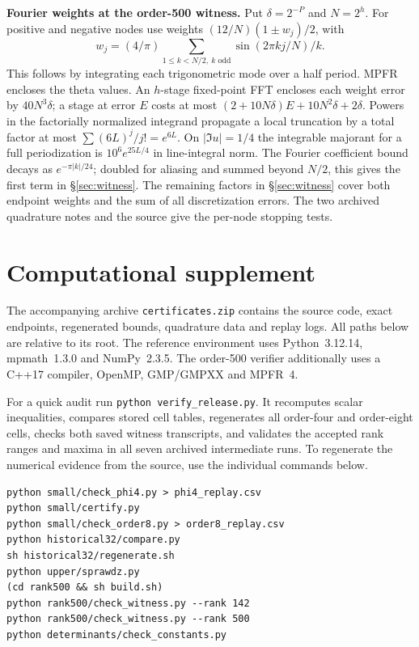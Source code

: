 \documentclass[11pt,a4paper,reqno]{amsart}
\numberwithin{equation}{section}
\begin{document}
\textbf{Fourier weights at the order-500 witness.} Put \(\delta=2^{-P}\) and \(N=2^h\). For positive and negative nodes use weights \((12/N)(1\pm w_j)/2\), with \[w_j=(4/\pi)\sum_{1\le k<N/2,\ k\text{ odd}}\sin(2\pi kj/N)/k.\] This follows by integrating each trigonometric mode over a half period. MPFR encloses the theta values. An \(h\)-stage fixed-point FFT encloses each weight error by \(40N^3\delta\); a stage at error \(E\) costs at most \((2+10N\delta)E+10N^2\delta+2\delta\). Powers in the factorially normalized integrand propagate a local truncation by a total factor at most \(\sum (6L)^j/j!=e^{6L}\). On \(\lvert\Im u\rvert=1/4\) the integrable majorant for a full periodization is \(10^6e^{25L/4}\) in line-integral norm. The Fourier coefficient bound decays as \(e^{-\pi|k|/24}\); doubled for aliasing and summed beyond \(N/2\), this gives the first term in \S\ref{sec:witness}. The remaining factors in \S\ref{sec:witness} cover both endpoint weights and the sum of all discretization errors. The two archived quadrature notes and the source give the per-node stopping tests.

\section{Computational supplement}\label{sec:replay}


The accompanying archive \texttt{certificates.zip} contains the source code, exact endpoints, regenerated bounds, quadrature data and replay logs. All paths below are relative to its root. The reference environment uses Python~3.12.14, mpmath~1.3.0 and NumPy~2.3.5. The order-500 verifier additionally uses a C++17 compiler, OpenMP, GMP/GMPXX and MPFR~4.

For a quick audit run \texttt{python verify\_release.py}. It recomputes scalar inequalities, compares stored cell tables, regenerates all order-four and order-eight cells, checks both saved witness transcripts, and validates the accepted rank ranges and maxima in all seven archived intermediate runs. To regenerate the numerical evidence from the source, use the individual commands below.

\begin{verbatim}
python small/check_phi4.py > phi4_replay.csv
python small/certify.py
python small/check_order8.py > order8_replay.csv
python historical32/compare.py
sh historical32/regenerate.sh
python upper/sprawdz.py
(cd rank500 && sh build.sh)
python rank500/check_witness.py --rank 142
python rank500/check_witness.py --rank 500
python determinants/check_constants.py
\end{verbatim}
\end{document}
